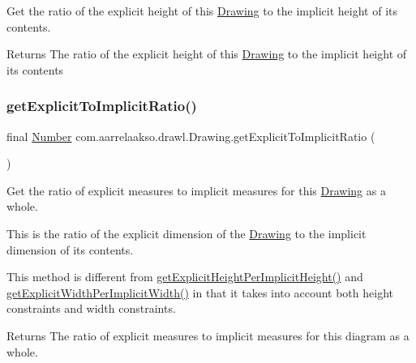 Get the ratio of the explicit height of this \hyperlink{classcom_1_1aarrelaakso_1_1drawl_1_1_drawing}{Drawing} to the implicit height of its contents. 

\begin{DoxyReturn}{Returns}
The ratio of the explicit height of this \hyperlink{classcom_1_1aarrelaakso_1_1drawl_1_1_drawing}{Drawing} to the implicit height of its contents 
\end{DoxyReturn}
\mbox{\label{classcom_1_1aarrelaakso_1_1drawl_1_1_drawing_a9b47750a4d38fc2db164f0a0cb0e4a42}} 
\subsubsection{\texorpdfstring{get\+Explicit\+To\+Implicit\+Ratio()}{getExplicitToImplicitRatio()}}
{\footnotesize\ttfamily final \hyperlink{interfacecom_1_1aarrelaakso_1_1drawl_1_1_number}{Number} com.\+aarrelaakso.\+drawl.\+Drawing.\+get\+Explicit\+To\+Implicit\+Ratio (\begin{DoxyParamCaption}{ }\end{DoxyParamCaption})\hspace{0.3cm}{\ttfamily [protected]}}



Get the ratio of explicit measures to implicit measures for this \hyperlink{classcom_1_1aarrelaakso_1_1drawl_1_1_drawing}{Drawing} as a whole. 

This is the ratio of the explicit dimension of the \hyperlink{classcom_1_1aarrelaakso_1_1drawl_1_1_drawing}{Drawing} to the implicit dimension of its contents. 

This method is different from \hyperlink{classcom_1_1aarrelaakso_1_1drawl_1_1_drawing_a7e165d3b122c0fd44404c20c1211c21f}{get\+Explicit\+Height\+Per\+Implicit\+Height()} and \hyperlink{classcom_1_1aarrelaakso_1_1drawl_1_1_drawing_afd070929603e97a649a65a888b5f76da}{get\+Explicit\+Width\+Per\+Implicit\+Width()} in that it takes into account both height constraints and width constraints.

\begin{DoxyReturn}{Returns}
The ratio of explicit measures to implicit measures for this diagram as a whole. 
\end{DoxyReturn}
\mbox{\label{classcom_1_1aarrelaakso_1_1drawl_1_1_drawing_a0de258c25c1d13e3c2d71ab6a90606ef}} 

